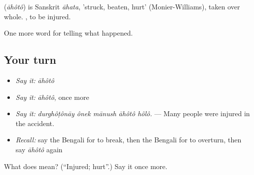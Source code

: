 \begin{cousinweb}
\textbf{} (\emph{āhôtô}) is Sanskrit \emph{āhata}, 'struck, beaten, hurt' (Monier-Williams), taken over whole.  , to be injured.
\end{cousinweb}

\begin{grammarlens}[title={What you've built}]
One more word for telling what happened.
\end{grammarlens}

\subsection*{Your turn}
\begin{itemize}
\raggedright
  \item \emph{Say it:} \emph{āhôtô}
  \item \emph{Say it:} \emph{āhôtô}, once more
  \item \emph{Say it:} \emph{durghôṭônāy ônek mānush āhôtô hôlô.} — Many people were injured in the accident.
  \item \emph{Recall:} say the Bengali for to break, then the Bengali for to overturn, then say \emph{āhôtô} again
\end{itemize}

\begin{tcolorbox}[breakable,colback=teal!4,colframe=teal!35!black,title={Before you move on}]
What does  mean? (\textquotedblleft{}Injured; hurt\textquotedblright{}.) Say it once more.
\end{tcolorbox}
